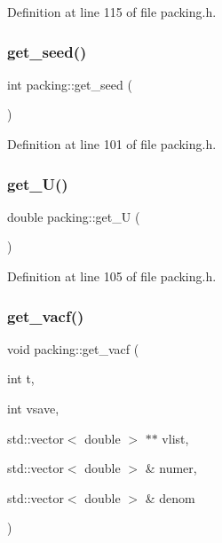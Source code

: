 Definition at line 115 of file packing.\+h.

\mbox{\label{classpacking_ac99ab03b903298da3ac29dde9fdd4ad1}} 
\subsubsection{\texorpdfstring{get\+\_\+seed()}{get\_seed()}}
{\footnotesize\ttfamily int packing\+::get\+\_\+seed (\begin{DoxyParamCaption}{ }\end{DoxyParamCaption})\hspace{0.3cm}{\ttfamily [inline]}}



Definition at line 101 of file packing.\+h.

\mbox{\label{classpacking_ac2544dd44e1dd8bfb08315f94d543bc3}} 
\subsubsection{\texorpdfstring{get\+\_\+\+U()}{get\_U()}}
{\footnotesize\ttfamily double packing\+::get\+\_\+U (\begin{DoxyParamCaption}{ }\end{DoxyParamCaption})\hspace{0.3cm}{\ttfamily [inline]}}



Definition at line 105 of file packing.\+h.

\mbox{\label{classpacking_ab91f79587ed1579f6754e956e7939597}} 
\subsubsection{\texorpdfstring{get\+\_\+vacf()}{get\_vacf()}}
{\footnotesize\ttfamily void packing\+::get\+\_\+vacf (\begin{DoxyParamCaption}\item[{int}]{t,  }\item[{int}]{vsave,  }\item[{std\+::vector$<$ double $>$ $\ast$$\ast$}]{vlist,  }\item[{std\+::vector$<$ double $>$ \&}]{numer,  }\item[{std\+::vector$<$ double $>$ \&}]{denom }\end{DoxyParamCaption})}



